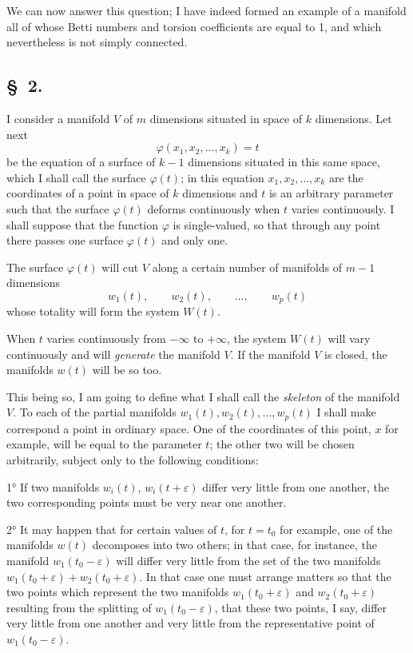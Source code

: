 \documentclass{article}
\begin{document}
We can now answer this question; I have indeed formed an example of a manifold all of whose Betti numbers and torsion coefficients are equal to 1, and which nevertheless is not simply connected.

\subsection*{\S~2.}

I consider a manifold $V$ of $m$ dimensions situated in space of $k$ dimensions. Let next
\[ \varphi(x_{1}, x_{2}, \ldots, x_{k}) = t \]
be the equation of a surface of $k - 1$ dimensions situated in this same space, which I shall call the surface $\varphi(t)$; in this equation $x_{1}, x_{2}, \ldots, x_{k}$ are the coordinates of a point in space of $k$ dimensions and $t$ is an arbitrary parameter such that the surface $\varphi(t)$ deforms continuously when $t$ varies continuously. I shall suppose that the function $\varphi$ is single-valued, so that through any point there passes one surface $\varphi(t)$ and only one.

The surface $\varphi(t)$ will cut $V$ along a certain number of manifolds of $m - 1$ dimensions
\[ w_{1}(t), \qquad w_{2}(t), \qquad \ldots, \qquad w_{p}(t) \]
whose totality will form the system $W(t)$.

When $t$ varies continuously from $-\infty$ to $+\infty$, the system $W(t)$ will vary continuously and will \emph{generate} the manifold $V$. If the manifold $V$ is closed, the manifolds $w(t)$ will be so too.

This being so, I am going to define what I shall call the \emph{skeleton} of the manifold $V$. To each of the partial manifolds $w_{1}(t), w_{2}(t), \ldots, w_{p}(t)$ I shall make correspond a point in ordinary space. One of the coordinates of this point, $x$ for example, will be equal to the parameter $t$; the other two will be chosen arbitrarily, subject only to the following conditions:


1° If two manifolds $w_{i}(t)$, $w_{i}(t + \varepsilon)$ differ very little from one another, the two corresponding points must be very near one another.

2° It may happen that for certain values of $t$, for $t = t_{0}$ for example, one of the manifolds $w(t)$ decomposes into two others; in that case, for instance, the manifold $w_{1}(t_{0} - \varepsilon)$ will differ very little from the set of the two manifolds $w_{1}(t_{0} + \varepsilon) + w_{2}(t_{0} + \varepsilon)$. In that case one must arrange matters so that the two points which represent the two manifolds $w_{1}(t_{0} + \varepsilon)$ and $w_{2}(t_{0} + \varepsilon)$ resulting from the splitting of $w_{1}(t_{0} - \varepsilon)$, that these two points, I say, differ very little from one another and very little from the representative point of $w_{1}(t_{0} - \varepsilon)$.
\end{document}
